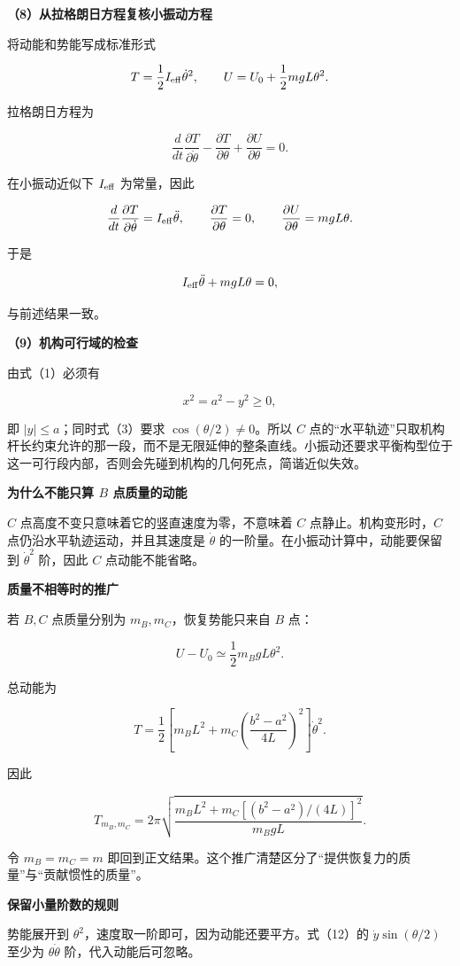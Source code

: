 \documentclass[12pt,a4paper,UTF8]{ctexart}
\begin{document}
\textbf{（8）从拉格朗日方程复核小振动方程}

将动能和势能写成标准形式

\[
T=\frac12I_{\rm eff}\dot\theta^2,
\qquad
U=U_0+\frac12mgL\theta^2.
\]

拉格朗日方程为

\[
\frac d{dt}\frac{\partial T}{\partial\dot\theta}
-\frac{\partial T}{\partial\theta}
+\frac{\partial U}{\partial\theta}=0.
\]

在小振动近似下 \(I_{\rm eff}\) 为常量，因此

\[
\frac d{dt}\frac{\partial T}{\partial\dot\theta}
=I_{\rm eff}\ddot\theta,
\qquad
\frac{\partial T}{\partial\theta}=0,
\qquad
\frac{\partial U}{\partial\theta}=mgL\theta.
\]

于是

\[
I_{\rm eff}\ddot\theta+mgL\theta=0,
\]

与前述结果一致。

\textbf{（9）机构可行域的检查}

由式（1）必须有

\[
x^2=a^2-y^2\geq0,
\]

即 \(|y|\leq a\)；同时式（3）要求 \(\cos(\theta/2)\ne0\)。所以 \(C\)
点的``水平轨迹''只取机构杆长约束允许的那一段，而不是无限延伸的整条直线。小振动还要求平衡构型位于这一可行段内部，否则会先碰到机构的几何死点，简谐近似失效。

\textbf{为什么不能只算 \(B\) 点质量的动能}

\(C\) 点高度不变只意味着它的竖直速度为零，不意味着 \(C\)
点静止。机构变形时，\(C\) 点仍沿水平轨迹运动，并且其速度是
\(\dot\theta\) 的一阶量。在小振动计算中，动能要保留到 \(\dot\theta^2\)
阶，因此 \(C\) 点动能不能省略。

\textbf{质量不相等时的推广}

若 \(B,C\) 点质量分别为 \(m_B,m_C\)，恢复势能只来自 \(B\) 点：

\[
U-U_0\simeq\frac12m_BgL\theta^2.
\]

总动能为

\[
T=\frac12\left[
m_BL^2+m_C\left(\frac{b^2-a^2}{4L}\right)^2
\right]\dot\theta^2.
\]

因此

\[
T_{m_B,m_C}=2\pi\sqrt{
\frac{m_BL^2+m_C[(b^2-a^2)/(4L)]^2}
{m_BgL}}
.
\]

令 \(m_B=m_C=m\)
即回到正文结果。这个推广清楚区分了``提供恢复力的质量''与``贡献惯性的质量''。

\textbf{保留小量阶数的规则}

势能展开到 \(\theta^2\)，速度取一阶即可，因为动能还要平方。式（12）的
\(\dot y\sin(\theta/2)\) 至少为 \(\theta\dot\theta\)
阶，代入动能后可忽略。
\end{document}
